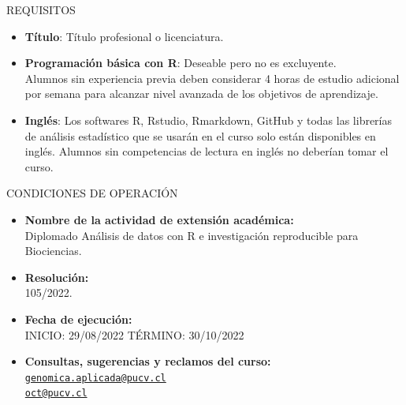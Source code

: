 \documentclass[
  ignorenonframetext,
]{beamer}
\begin{document}
\begin{frame}{REQUISITOS}
\protect\hypertarget{requisitos}{}

\begin{itemize}
\item
  \textbf{Título}: Título profesional o licenciatura.
\item
  \textbf{Programación básica con R}: Deseable pero no es excluyente.\\
  Alumnos sin experiencia previa deben considerar 4 horas de estudio
  adicional por semana para alcanzar nivel avanzada de los objetivos de
  aprendizaje.
\item
  \textbf{Inglés}: Los softwares R, Rstudio, Rmarkdown, GitHub y todas
  las librerías de análisis estadístico que se usarán en el curso solo
  están disponibles en inglés. Alumnos sin competencias de lectura en
  inglés no deberían tomar el curso.
\end{itemize}

\end{frame}

\begin{frame}{CONDICIONES DE OPERACIÓN}
\protect\hypertarget{condiciones-de-operaciuxf3n}{}

\begin{itemize}
\item
  \textbf{Nombre de la actividad de extensión académica:}\\
  Diplomado Análisis de datos con R e investigación reproducible para
  Biociencias.
\item
  \textbf{Resolución:}\\
  105/2022.
\item
  \textbf{Fecha de ejecución:}\\
  INICIO: 29/08/2022 TÉRMINO: 30/10/2022
\item
  \textbf{Consultas, sugerencias y reclamos del curso:}
  \href{mailto:genomica.aplicada@pucv.cl}{\nolinkurl{genomica.aplicada@pucv.cl}}\\
  \href{mailto:oct@pucv.cl}{\nolinkurl{oct@pucv.cl}}
\end{itemize}

\end{frame}
\end{document}
